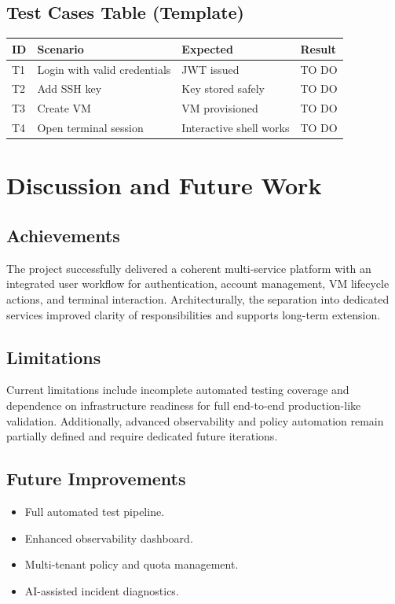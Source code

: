 \documentclass[12pt,a4paper]{report}
\begin{document}
\section{Test Cases Table (Template)}
\begin{longtable}{p{} p{} p{} p{}}
\toprule
\textbf{ID} & \textbf{Scenario} & \textbf{Expected} & \textbf{Result} \\
\midrule
T1 & Login with valid credentials & JWT issued & TO DO \\
T2 & Add SSH key & Key stored safely & TO DO \\
T3 & Create VM & VM provisioned & TO DO \\
T4 & Open terminal session & Interactive shell works & TO DO \\
\bottomrule
\end{longtable}

\chapter{Discussion and Future Work}
\section{Achievements}
The project successfully delivered a coherent multi-service platform with an integrated user workflow for authentication, account management, VM lifecycle actions, and terminal interaction.
Architecturally, the separation into dedicated services improved clarity of responsibilities and supports long-term extension.

\section{Limitations}
Current limitations include incomplete automated testing coverage and dependence on infrastructure readiness for full end-to-end production-like validation.
Additionally, advanced observability and policy automation remain partially defined and require dedicated future iterations.

\section{Future Improvements}
\begin{itemize}
    \item Full automated test pipeline.
    \item Enhanced observability dashboard.
    \item Multi-tenant policy and quota management.
    \item AI-assisted incident diagnostics.
\end{itemize}
\end{document}
